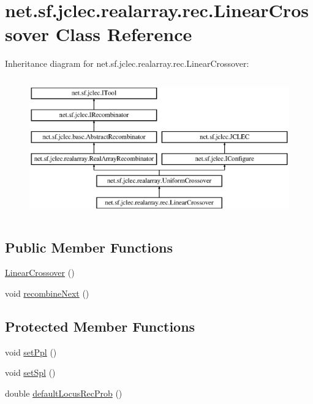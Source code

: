 \hypertarget{classnet_1_1sf_1_1jclec_1_1realarray_1_1rec_1_1_linear_crossover}{\section{net.\-sf.\-jclec.\-realarray.\-rec.\-Linear\-Crossover Class Reference}
\label{classnet_1_1sf_1_1jclec_1_1realarray_1_1rec_1_1_linear_crossover}
}
Inheritance diagram for net.\-sf.\-jclec.\-realarray.\-rec.\-Linear\-Crossover\-:\begin{figure}[H]
\begin{center}
\leavevmode
\includegraphics[height=6.000000cm]{classnet_1_1sf_1_1jclec_1_1realarray_1_1rec_1_1_linear_crossover}
\end{center}
\end{figure}
\subsection*{Public Member Functions}
\begin{DoxyCompactItemize}
\item 
\hyperlink{classnet_1_1sf_1_1jclec_1_1realarray_1_1rec_1_1_linear_crossover_a4760689fb1c7c3f415c4de317d53bc23}{Linear\-Crossover} ()
\item 
void \hyperlink{classnet_1_1sf_1_1jclec_1_1realarray_1_1rec_1_1_linear_crossover_a384fc6ed44b1504cd35dca0a3497a129}{recombine\-Next} ()
\end{DoxyCompactItemize}
\subsection*{Protected Member Functions}
\begin{DoxyCompactItemize}
\item 
void \hyperlink{classnet_1_1sf_1_1jclec_1_1realarray_1_1rec_1_1_linear_crossover_a86b0311d3a1f887602490924c0c022ce}{set\-Ppl} ()
\item 
void \hyperlink{classnet_1_1sf_1_1jclec_1_1realarray_1_1rec_1_1_linear_crossover_a9197d3ab553a26ca78f6a341e95803cf}{set\-Spl} ()
\item 
double \hyperlink{classnet_1_1sf_1_1jclec_1_1realarray_1_1rec_1_1_linear_crossover_a69aed17dfe5b613157dd7610ccd9ec44}{default\-Locus\-Rec\-Prob} ()
\end{DoxyCompactItemize}
